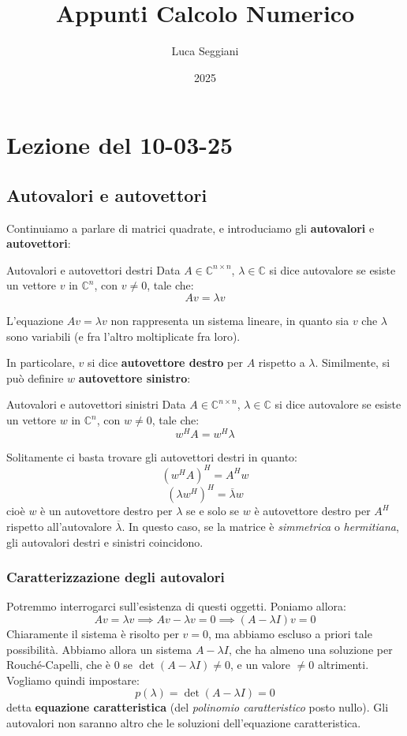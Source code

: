 \documentclass[a4paper,11pt]{article}
\title{Appunti Calcolo Numerico}
\author{Luca Seggiani}
\date{2025}
\begin{document}
\section{Lezione del 10-03-25}

\thispagestyle{empty}
\pagestyle{fancy}

\subsection{Autovalori e autovettori}
Continuiamo a parlare di matrici quadrate, e introduciamo gli \textbf{autovalori} e \textbf{autovettori}:
\begin{definition}{Autovalori e autovettori destri}
	Data $A \in \mathbb{C}^{n\times n}$, $\lambda \in \mathbb{C}$ si dice autovalore se esiste un vettore $v$ in $\mathbb{C}^{n}$, con $v \neq 0$, tale che:
	$$
		Av = \lambda v
	$$
\end{definition}

L'equazione $Av = \lambda v$ non rappresenta un sistema lineare, in quanto sia $v$ che $\lambda$ sono variabili (e fra l'altro moltiplicate fra loro).

In particolare, $v$ si dice \textbf{autovettore destro} per $A$ rispetto a $\lambda$.
Similmente, si può definire $w$ \textbf{autovettore sinistro}:
\begin{definition}{Autovalori e autovettori sinistri}
	Data $A \in \mathbb{C}^{n\times n}$, $\lambda \in \mathbb{C}$ si dice autovalore se esiste un vettore $w$ in $\mathbb{C}^{n}$, con $w \neq 0$, tale che:
	$$
		w^H A = w^H \lambda
	$$
\end{definition}

Solitamente ci basta trovare gli autovettori destri in quanto:
$$
(w^H A)^H = A^H w 
$$
$$
(\lambda w^H)^H = \overline{\lambda} w
$$
cioè $w$ è un autovettore destro per $\lambda$ se e solo se $w$ è autovettore destro per $A^H$ rispetto all'autovalore $\overline{\lambda}$.
In questo caso, se la matrice è \textit{simmetrica} o \textit{hermitiana}, gli autovalori destri e sinistri coincidono.

\subsubsection{Caratterizzazione degli autovalori}
Potremmo interrogarci sull'esistenza di questi oggetti.
Poniamo allora:
$$
Av = \lambda v \implies Av - \lambda v = 0 \implies (A - \lambda I) v = 0
$$
Chiaramente il sistema è risolto per $v = 0$, ma abbiamo escluso a priori tale possibilità.
Abbiamo allora un sistema $A - \lambda I$, che ha almeno una soluzione per Rouché-Capelli, che è $0$ se $\det(A - \lambda I) \neq 0$, e un valore $\neq 0$ altrimenti.
Vogliamo quindi impostare:
$$
p(\lambda) = \det(A - \lambda I) = 0
$$
detta \textbf{equazione caratteristica} (del \textit{polinomio caratteristico} posto nullo).
Gli autovalori non saranno altro che le soluzioni dell'equazione caratteristica.
\end{document}
